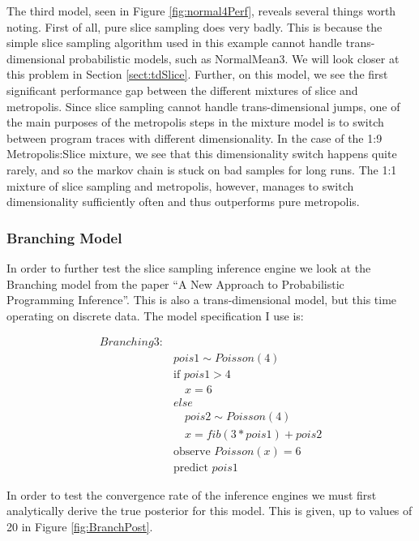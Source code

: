 The third model, seen in Figure \ref{fig:normal4Perf}, reveals several things worth noting. First of all, pure slice sampling does very badly. This is because the simple slice sampling algorithm used in this example cannot handle trans-dimensional probabilistic models, such as NormalMean3. We will look closer at this problem in Section \ref{sect:tdSlice}. Further, on this model, we see the first significant performance gap between the different mixtures of slice and metropolis. Since slice sampling cannot handle trans-dimensional jumps, one of the main purposes of the metropolis steps in the mixture model is to switch between program traces with different dimensionality. In the case of the 1:9 Metropolis:Slice mixture, we see that this dimensionality switch happens quite rarely, and so the markov chain is stuck on bad samples for long runs. The 1:1 mixture of slice sampling and metropolis, however, manages to switch dimensionality sufficiently often and thus outperforms pure metropolis.

\subsubsection{Branching Model}
\label{sect:branching}
In order to further test the slice sampling inference engine we look at the Branching model from the paper ``A New Approach to Probabilistic Programming Inference''. This is also a trans-dimensional model, but this time operating on discrete data.  The model specification I use is:

\begin{align*}
  Branching3:
  \\& pois1 \sim Poisson(4)
  \\&\text{if }pois1 > 4
  \\&\quad x = 6
  \\&else
  \\&\quad pois2 \sim Poisson(4)
  \\&\quad x = fib(3 * pois1) + pois2 \tag{$fib$ is the fibonacci function}
  \\&\text{observe }Poisson(x) = 6
  \\&\text{predict }pois1
\end{align*}

In order to test the convergence rate of the inference engines we must first analytically derive the true posterior for this model. This is given, up to values of 20 in Figure \ref{fig:BranchPost}.

